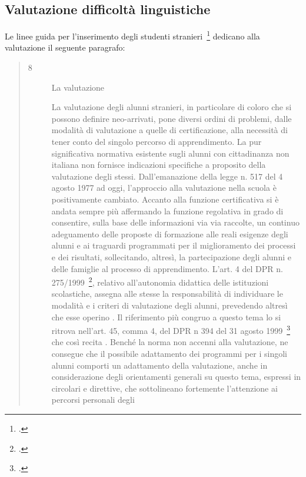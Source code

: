 \subsection{Valutazione difficoltà linguistiche }
 Le linee guida per l'inserimento degli studenti stranieri~\footcite{lin_1_marzo_2006} dedicano alla valutazione il seguente paragrafo: 
 \begin{quote}
 	\begin{description}
 		\item[8] La valutazione
 		
 		La valutazione degli alunni stranieri, in particolare di coloro che si possono definire
 		neo-arrivati, pone diversi ordini di problemi, dalle modalità di valutazione a quelle di
 			certificazione, alla necessità di tener conto del singolo percorso di apprendimento. La pur
 			significativa normativa esistente sugli alunni con cittadinanza non italiana non fornisce
 			indicazioni specifiche a proposito della valutazione degli stessi.
 			Dall'emanazione della legge n. 517 del 4 agosto 1977 ad oggi, l'approccio alla
 			valutazione nella scuola è positivamente cambiato. Accanto alla funzione certificativa si è
 			andata sempre più affermando la funzione regolativa in grado di consentire, sulla base delle
 			informazioni via via raccolte, un continuo adeguamento delle proposte di formazione alle
 			reali esigenze degli alunni e ai traguardi programmati per il miglioramento dei processi e dei
 			risultati, sollecitando, altresì, la partecipazione degli alunni e delle famiglie al processo di
 			apprendimento. L'art. 4 del DPR n. 275/1999~\footcite{DPR_275_1999}, relativo all'autonomia didattica delle
 			istituzioni scolastiche, assegna alle stesse la responsabilità di individuare le modalità e i
 			criteri di valutazione degli alunni, prevedendo altresì che esse operino .
 			Il riferimento più congruo a questo tema lo si ritrova nell'art. 45, comma 4, del DPR
 			n 394 del 31 agosto 1999~\footcite{DPR_394_1999} che così recita . Benché la norma non accenni alla valutazione, ne consegue che il
 			possibile adattamento dei programmi per i singoli alunni comporti un adattamento della
 			valutazione, anche in considerazione degli orientamenti generali su questo tema, espressi in
 			circolari e direttive, che sottolineano fortemente l'attenzione ai percorsi personali degli

\end{description}
\end{quote}
